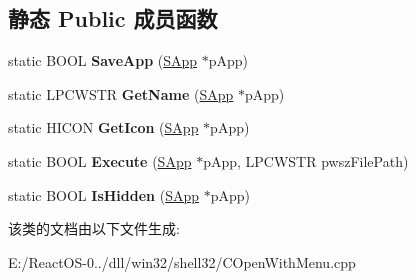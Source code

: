 \subsection*{静态 Public 成员函数}
\begin{DoxyCompactItemize}
\item 
\mbox{\label{class_c_open_with_list_a131c3e6b137bd87965af0490048a05d9}} 
static B\+O\+OL {\bfseries Save\+App} (\hyperlink{struct_c_open_with_list_1_1_s_app}{S\+App} $\ast$p\+App)
\item 
\mbox{\label{class_c_open_with_list_a1fcc3b5acefd3ee7a9d04175cd09fc54}} 
static L\+P\+C\+W\+S\+TR {\bfseries Get\+Name} (\hyperlink{struct_c_open_with_list_1_1_s_app}{S\+App} $\ast$p\+App)
\item 
\mbox{\label{class_c_open_with_list_a67d6232aee95be4824ebe9f644214f11}} 
static H\+I\+C\+ON {\bfseries Get\+Icon} (\hyperlink{struct_c_open_with_list_1_1_s_app}{S\+App} $\ast$p\+App)
\item 
\mbox{\label{class_c_open_with_list_a2300bd40c4bac3c10b568deb5b198c6e}} 
static B\+O\+OL {\bfseries Execute} (\hyperlink{struct_c_open_with_list_1_1_s_app}{S\+App} $\ast$p\+App, L\+P\+C\+W\+S\+TR pwsz\+File\+Path)
\item 
\mbox{\label{class_c_open_with_list_aba2f16dee838e0d6fc51f6232b947227}} 
static B\+O\+OL {\bfseries Is\+Hidden} (\hyperlink{struct_c_open_with_list_1_1_s_app}{S\+App} $\ast$p\+App)
\end{DoxyCompactItemize}


该类的文档由以下文件生成\+:\begin{DoxyCompactItemize}
\item 
E\+:/\+React\+O\+S-\/0../dll/win32/shell32/C\+Open\+With\+Menu.\+cpp\end{DoxyCompactItemize}
